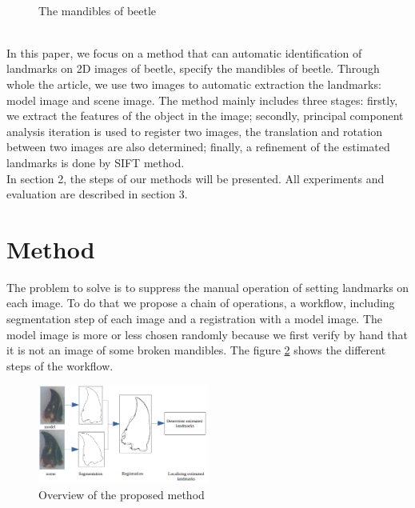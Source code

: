 \documentclass[twoside,twocolumn,10pt]{article}
\begin{document}
\begin{figure}[h]
\centering
{}~~
\caption{The mandibles of beetle}
\label{figparts}
\end{figure}~\\[0.1cm]
In this paper, we focus on a method that can automatic identification
of landmarks on 2D images of beetle, specify the mandibles of
beetle. Through whole the article, we use two images to automatic
extraction the landmarks: model image and scene image. The method
mainly includes three stages: firstly, we extract the features of the
object in the image; secondly, principal component analysis iteration is 
used to register two images, the translation and
rotation between two images are also determined; finally, a refinement of
the estimated landmarks is done by SIFT method.\\[0.1cm]

In section 2, the steps of our methods will be presented. All
experiments and evaluation are described in section 3. 

\section{Method}
The problem to solve is to suppress the manual operation of setting
landmarks on each image. To do that we propose a chain of operations,
a workflow, including segmentation step of each image and a registration
with a model image. The model image is more or less chosen randomly because we first
verify by hand that it is not an image of some broken mandibles. The 
figure \ref{fig:method} shows the different steps of the workflow. \\
\begin{figure}[htb]
    \centering
    \includegraphics[width=0.5\textwidth]{./images/method}
    \caption{Overview of the proposed method}
    \label{fig:method}
\end{figure}~\\
\end{document}
